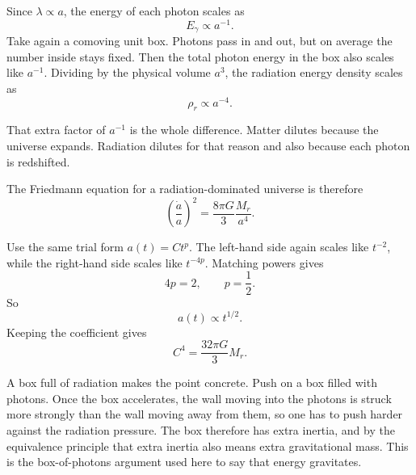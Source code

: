 Since \(\lambda\propto a\), the energy of each photon scales as
\begin{equation}
E_\gamma\propto a^{-1}.
\end{equation}
Take again a comoving unit box. Photons pass in and out, but on average the number inside stays fixed. Then the total photon energy in the box also scales like \(a^{-1}\). Dividing by the physical volume \(a^3\), the radiation energy density scales as
\begin{equation}
\rho_r\propto a^{-4}.
\end{equation}

That extra factor of \(a^{-1}\) is the whole difference. Matter dilutes because the universe expands. Radiation dilutes for that reason and also because each photon is redshifted.

The Friedmann equation for a radiation-dominated universe is therefore
\begin{equation}
\left(\frac{\dot a}{a}\right)^2=\frac{8\pi G}{3}\frac{M_r}{a^4}.
\end{equation}

Use the same trial form \(a(t)=Ct^p\). The left-hand side again scales like \(t^{-2}\), while the right-hand side scales like \(t^{-4p}\). Matching powers gives
\begin{equation}
4p=2,
\qquad
p=\frac{1}{2}.
\end{equation}
So
\begin{equation}
a(t)\propto t^{1/2}.
\end{equation}
Keeping the coefficient gives
\begin{equation}
C^4=\frac{32\pi G}{3}M_r.
\end{equation}

\begin{classroomqa}
\end{classroomqa}

A box full of radiation makes the point concrete. Push on a box filled with photons. Once the box accelerates, the wall moving into the photons is struck more strongly than the wall moving away from them, so one has to push harder against the radiation pressure. The box therefore has extra inertia, and by the equivalence principle that extra inertia also means extra gravitational mass. This is the box-of-photons argument used here to say that energy gravitates.

